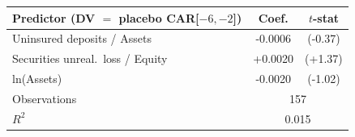 \begin{tabular}{lcc}
\toprule
Predictor (DV $=$ placebo CAR[$-6,-2$]) & Coef. & $t$-stat \\
\midrule
Uninsured deposits / Assets & -0.0006 & (-0.37) \\
Securities unreal.\ loss / Equity & +0.0020 & (+1.37) \\
ln(Assets) & -0.0020 & (-1.02) \\
\midrule
Observations & \multicolumn{2}{c}{157} \\
$R^2$ & \multicolumn{2}{c}{0.015} \\
\bottomrule
\end{tabular}